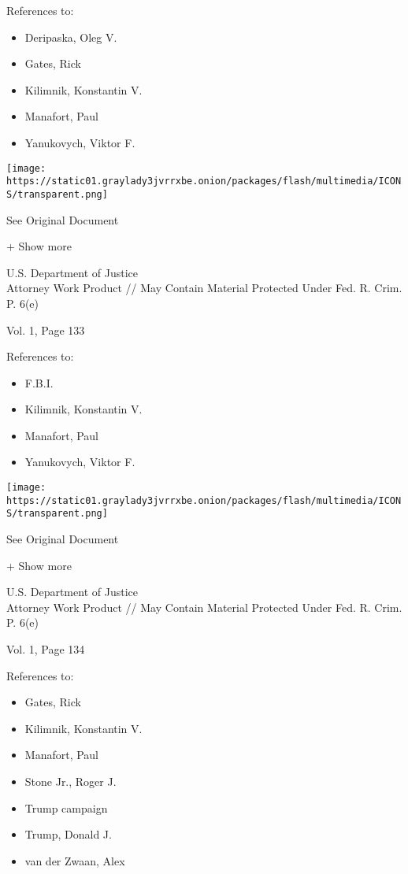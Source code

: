 References to:

\begin{itemize}
\tightlist
\item
  Deripaska, Oleg V.
\item
  Gates, Rick
\item
  Kilimnik, Konstantin V.
\item
  Manafort, Paul 
\item
  Yanukovych, Viktor F.
\end{itemize}

\protect\hyperlink{}{}

\texttt{[image: https://static01.graylady3jvrrxbe.onion/packages/flash/multimedia/ICONS/transparent.png]}

See Original Document

+ Show more

U.S. Department of Justice\\
Attorney Work Product // May Contain Material Protected Under Fed. R.
Crim. P. 6(e)

Vol. 1, Page 133

References to:

\begin{itemize}
\tightlist
\item
  F.B.I.
\item
  Kilimnik, Konstantin V.
\item
  Manafort, Paul 
\item
  Yanukovych, Viktor F.
\end{itemize}

\protect\hyperlink{}{}

\texttt{[image: https://static01.graylady3jvrrxbe.onion/packages/flash/multimedia/ICONS/transparent.png]}

See Original Document

+ Show more

U.S. Department of Justice\\
Attorney Work Product // May Contain Material Protected Under Fed. R.
Crim. P. 6(e)

Vol. 1, Page 134

References to:

\begin{itemize}
\tightlist
\item
  Gates, Rick
\item
  Kilimnik, Konstantin V.
\item
  Manafort, Paul 
\item
  Stone Jr., Roger J.
\item
  Trump campaign
\item
  Trump, Donald J.
\item
  van der Zwaan, Alex
\end{itemize}

